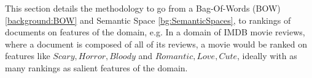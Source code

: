 This section details the methodology to go from a Bag-Of-Words (BOW) \ref{background:BOW} and Semantic Space \ref{bg:SemanticSpaces}, to rankings of documents on features of the domain, e.g. In a domain of IMDB movie reviews, where a document is composed of all of its reviews, a movie would be ranked on features like ${Scary, Horror, Bloody}$ and ${Romantic, Love, Cute}$, ideally with as many rankings as salient features of the domain. 






